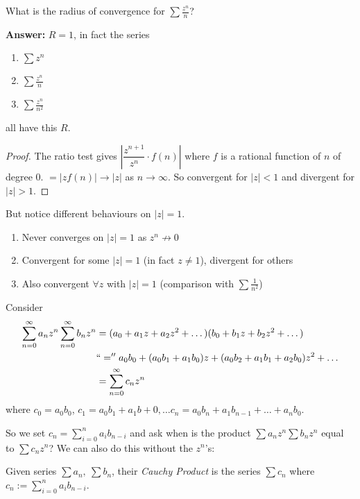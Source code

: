\begin{clicker}
What is the radius of convergence for $\sum \frac{z^n}{n}$? 

\textbf{Answer:} $R = 1$, in fact the series
\begin{enumerate}
\item $\sum z^n$
\item $\sum \frac{z^n}{n}$
\item $\sum \frac{z^n}{n^2}$	
\end{enumerate}
all have this $R$.

\begin{proof}
The ratio test gives  $\left|\dfrac{z^{n+1}}{z^n}\cdot f(n)\right|$ where $f$ is a rational function of $n$ of degree $0$. $= |zf(n)| \to |z|$ as $n \to \infty$. So convergent for $|z| < 1$ and divergent for $|z| > 1$.  	
\end{proof}

But notice different behaviours on $|z| = 1$. \begin{enumerate}
 \item Never converges on $|z| = 1$ as $z^n \not\to 0$
 \item Convergent for some $|z| = 1$ (in fact $z \neq 1$), divergent for others
 \item Also convergent $\forall z$ with $|z|  =1$ (comparison with $\sum \frac{1}{n^2}$)	
 \end{enumerate}
\end{clicker}






Consider 
\[\begin{aligned}
\sum_{n=0}^{\infty} a_nz^n \sum_{n=0}^{\infty}b_nz^n &= (a_0 + a_1z + a_2z^2 + \dots) (b_0 + b_1z + b_2z^2 + \dots)\\
&``='' a_0b_0 + (a_0b_1 + a_1b_0)z + (a_0b_2 + a_1b_1 + a_2b_0)z^2 + \dots \\
&= \sum_{n=0}^{\infty} c_nz^n 	
\end{aligned}
\]
where $c_0 = a_0b_0$, $c_1 = a_0b_1 + a_1b+0, \dots c_n = a_0b_n + a_1b_{n-1} + \dots + a_nb_0$. 

So we set $c_n = \sum_{i=0}^{n} a_i b_{n-i}$ and ask when is the product $\sum a_nz^n \sum b_nz^n$ equal to $\sum c_nz^n$? We can also do this without the $z^n$'s:\\

\begin{definition}
Given series $\sum a_n,~\sum b_n$, their \emph{Cauchy Product} is the series $\sum c_n$ where $c_n := \sum_{i=0}^n a_ib_{n-i}$.	
\end{definition}


